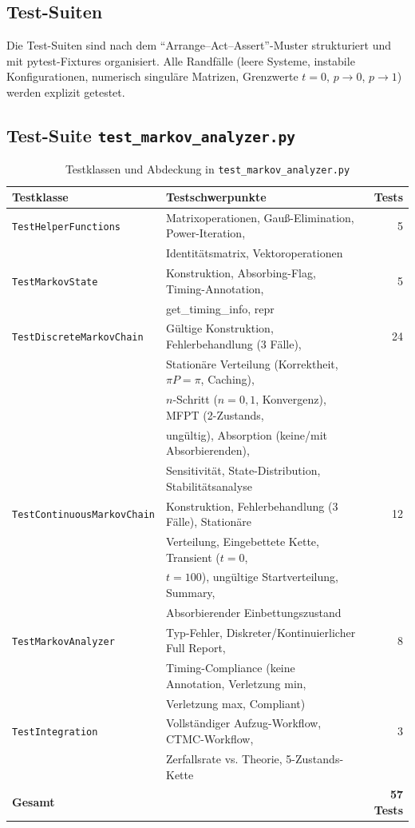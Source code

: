 ﻿\documentclass[a4paper,12pt]{report}
\theoremstyle{definition}
\begin{document}
\subsection{Test-Suiten}
\label{sec:tests-impl}

Die Test-Suiten sind nach dem ``Arrange--Act--Assert''-Muster strukturiert
und mit pytest-Fixtures organisiert. Alle Randfälle (leere Systeme,
instabile Konfigurationen, numerisch singuläre Matrizen, Grenzwerte $t=0$,
$p \to 0$, $p \to 1$) werden explizit getestet.

\subsection{Test-Suite \texttt{test\_markov\_analyzer.py}}

\begin{table}
	\centering
	\begin{tabular}{@{}llr@{}}
		\toprule
		\textbf{Testklasse} & \textbf{Testschwerpunkte} & \textbf{Tests} \\
		\midrule
		\texttt{TestHelperFunctions} & Matrixoperationen, Gauß-Elimination,
		Power-Iteration, & 5 \\
		& Identitätsmatrix, Vektoroperationen & \\
		\texttt{TestMarkovState} & Konstruktion, Absorbing-Flag,
		Timing-Annotation, & 5 \\
		& get\_timing\_info, repr & \\
		\texttt{TestDiscreteMarkovChain} & Gültige Konstruktion, Fehlerbehandlung
		(3 Fälle), & 24 \\
		& Stationäre Verteilung (Korrektheit, $\pi P=\pi$, Caching), & \\
		& $n$-Schritt ($n=0,1$, Konvergenz), MFPT (2-Zustands, & \\
		& ungültig), Absorption (keine/mit Absorbierenden), & \\
		& Sensitivität, State-Distribution, Stabilitätsanalyse & \\
		\texttt{TestContinuousMarkovChain} & Konstruktion, Fehlerbehandlung
		(3 Fälle), Stationäre & 12 \\
		& Verteilung, Eingebettete Kette, Transient ($t=0$, & \\
		& $t=100$), ungültige Startverteilung, Summary, & \\
		& Absorbierender Einbettungszustand & \\
		\texttt{TestMarkovAnalyzer} & Typ-Fehler, Diskreter/Kontinuierlicher
		Full Report, & 8 \\
		& Timing-Compliance (keine Annotation, Verletzung min, & \\
		& Verletzung max, Compliant) & \\
		\texttt{TestIntegration} & Vollständiger Aufzug-Workflow, CTMC-Workflow, & 3 \\
		& Zerfallsrate vs. Theorie, 5-Zustands-Kette & \\
		\midrule
		\textbf{Gesamt} & & \textbf{57 Tests} \\
		\bottomrule
	\end{tabular}
	\caption{Testklassen und Abdeckung in \texttt{test\_markov\_analyzer.py}}
\label{tab:test-markov}
	\label{tab:tests-markov}
\end{table}
\end{document}
